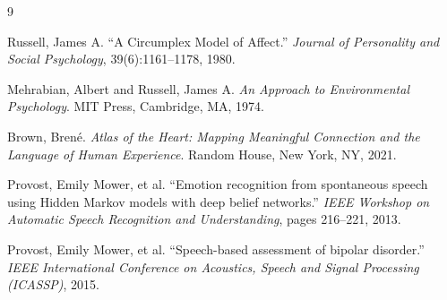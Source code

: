 \documentclass[11pt]{article}
\begin{document}

\begin{thebibliography}{9}

Russell, James A.
``A Circumplex Model of Affect.''
\textit{Journal of Personality and Social Psychology}, 39(6):1161--1178, 1980.

Mehrabian, Albert and Russell, James A.
\textit{An Approach to Environmental Psychology}.
MIT Press, Cambridge, MA, 1974.

Brown, Brené.
\textit{Atlas of the Heart: Mapping Meaningful Connection and the Language of Human Experience}.
Random House, New York, NY, 2021.

Provost, Emily Mower, et al.
``Emotion recognition from spontaneous speech using Hidden Markov models with deep belief networks.''
\textit{IEEE Workshop on Automatic Speech Recognition and Understanding}, pages 216--221, 2013.

Provost, Emily Mower, et al.
``Speech-based assessment of bipolar disorder.''
\textit{IEEE International Conference on Acoustics, Speech and Signal Processing (ICASSP)}, 2015.

\end{thebibliography}
\end{document}
